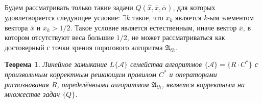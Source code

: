 \documentclass[a4paper, 12pt]{article}
\theoremstyle{plain}
\newtheorem{Theorem}{Теорема}
\begin{document}
	Будем рассматривать только такие задачи $Q(\hat{x},\bar{x},\bar{\alpha})$, для которых удовлетворяется следующее условие: ${\exists}k$ такое, что $x_k$ является $k$-ым элементом вектора $\bar{x}$ и $x_k>1/2$. Такое условие является естественным, иначе вектор $\bar{x}$, в котором отсутствуют веса большие $1/2$, не может рассматриваться как достоверный с точки зрения порогового алгоритма $\mathfrak A_{th}$.
	
	\begin{Theorem}
		\label{th:correctness}
		Линейное замыкание $L\{\mathcal{A}\}$ семейства алгоритмов $\{\mathcal{A}\}=\{R{\cdot}C^*\}$ с произвольным корректным решающим правилом $C^*$ и операторами распознавания $R$, определёнными алгоритмом $\mathfrak A_{th}$, является корректным на множестве задач $\{Q\}$.
	\end{Theorem}
\end{document}
